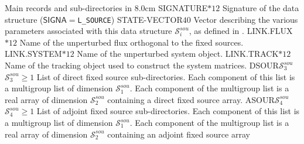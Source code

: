 \begin{DescriptionEnregistrement}{Main records and sub-directories in }{8.0cm}
\CharEnr
  {SIGNATURE}{$*12$}
  {Signature of the data structure ($\mathsf{SIGNA}=${\tt L\_SOURCE})}
\IntEnr
  {STATE-VECTOR}{$40$}
  {Vector describing the various parameters associated with this data structure $\mathcal{S}^{sou}_{i}$,
  as defined in .}
\CharEnr
  {LINK.FLUX}{$*12$}
  {Name of the unperturbed {\sc flux} orthogonal to the fixed sources.}
\CharEnr
  {LINK.SYSTEM}{$*12$}
  {Name of the unperturbed {\sc system} object.}
\CharEnr
  {LINK.TRACK}{$*12$}
  {Name of the tracking object used to construct the system matrices.}
\OptDirlEnr
  {DSOUR}{$\mathcal{S}^{sou}_{3}$}{$\mathcal{S}^{sou}_{3}\ge 1$}
  {List of direct fixed source sub-directories. Each component of this list is a multigroup list of
  dimension $\mathcal{S}^{sou}_{1}$. Each component of the multigroup list is a real array of dimension
  $\mathcal{S}^{sou}_{2}$ containing a direct fixed source array.}
\OptDirlEnr
  {ASOUR}{$\mathcal{S}^{sou}_{4}$}{$\mathcal{S}^{sou}_{4}\ge 1$}
  {List of adjoint fixed source sub-directories. Each component of this list is a multigroup list of
  dimension $\mathcal{S}^{sou}_{1}$. Each component of the multigroup list is a real array of dimension
  $\mathcal{S}^{sou}_{2}$ containing an adjoint fixed source array}
\end{DescriptionEnregistrement}

\eject
